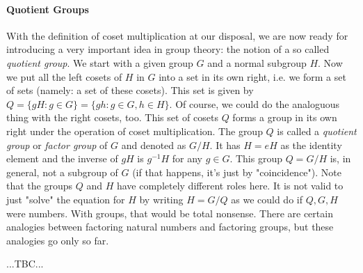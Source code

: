 \paragraph{Quotient Groups}
With the definition of coset multiplication at our disposal, we are now ready for introducing a very important idea in group theory: the notion of a so called \emph{quotient group}. We start with a given group $G$ and a normal subgroup $H$. Now we put all the left cosets of $H$ in $G$ into a set in its own right, i.e. we form a set of sets (namely: a set of these cosets). This set is given by $Q = \{ g H : g \in G \} =  \{ g h : g \in G, h \in H \}$. Of course, we could do the analoguous thing with the right cosets, too. This set of cosets $Q$ forms a group in its own right under the operation of coset multiplication. The group $Q$ is called a \emph{quotient group} or \emph{factor group} of $G$ and denoted as $G / H$. It has $H = e H$ as the identity element and the inverse of $g H$ is $g^{-1} H$ for any $g \in G$. This group $Q = G / H$ is, in general, not a subgroup of $G$ (if that happens, it's just by "coincidence"). Note that the groups $Q$ and $H$ have completely different roles here. It is not valid to just "solve" the equation for $H$ by writing $H = G / Q$ as we could do if $Q,G,H$ were numbers. With groups, that would be total nonsense. There are certain analogies between factoring natural numbers and factoring groups, but these analogies go only so far. 

...TBC...

\medskip
[TODO: Figure out if there are special cases where $Q = G / H \Leftrightarrow H = G / Q$ does indeed work out. Maybe when both $Q$ and $H$ are both (maximal) normal subgroups of $G$?]






